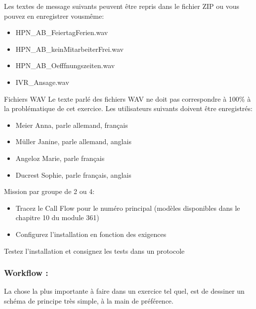 \documentclass[letterpaper,10pt,french]{sphinxmanual}
\begin{document}
\sphinxAtStartPar
Les textes de message suivants peuvent être repris dans le fichier ZIP ou vous pouvez en enregistrer vous\sphinxhyphen{}même:
\begin{itemize}
\item {} 
\sphinxAtStartPar
HPN\_AB\_FeiertagFerien.wav

\item {} 
\sphinxAtStartPar
HPN\_AB\_keinMitarbeiterFrei.wav

\item {} 
\sphinxAtStartPar
HPN\_AB\_Oefffnungszeiten.wav

\item {} 
\sphinxAtStartPar
IVR\_Ansage.wav

\end{itemize}

\sphinxAtStartPar
Fichiers WAV
Le texte parlé des fichiers WAV ne doit pas correspondre à 100\% à la problématique de cet exercice.
Les utilisateurs suivants doivent être enregistrés:
\begin{itemize}
\item {} 
\sphinxAtStartPar
Meier Anna, parle allemand, français

\item {} 
\sphinxAtStartPar
Müller Janine, parle allemand, anglais

\item {} 
\sphinxAtStartPar
Angeloz Marie, parle français

\item {} 
\sphinxAtStartPar
Ducrest Sophie, parle français, anglais

\end{itemize}

\sphinxAtStartPar
Mission par groupe de 2 ou 4:
\begin{itemize}
\item {} 
\sphinxAtStartPar
Tracez le Call Flow pour le numéro principal (modèles disponibles dans le chapitre 10 du module 361)

\item {} 
\sphinxAtStartPar
Configurez l’installation en fonction des exigences

\end{itemize}

\sphinxAtStartPar
Testez l’installation et consignez les tests dans un protocole


\subsubsection{Workflow :}
\label{\detokenize{Documentation-M362:workflow}}
\sphinxAtStartPar
La chose la plus importante à faire dans un exercice tel quel, est de dessiner un schéma de principe très simple, à la main de préférence.
\end{document}
